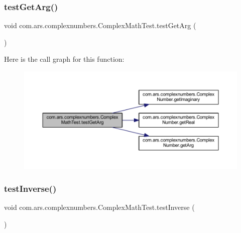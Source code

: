 \subsubsection{\texorpdfstring{test\+Get\+Arg()}{testGetArg()}}
{\footnotesize\ttfamily void com.\+ars.\+complexnumbers.\+Complex\+Math\+Test.\+test\+Get\+Arg (\begin{DoxyParamCaption}{ }\end{DoxyParamCaption})}

Here is the call graph for this function\+:\nopagebreak
\begin{figure}[H]
\begin{center}
\leavevmode
\includegraphics[width=350pt]{classcom_1_1ars_1_1complexnumbers_1_1_complex_math_test_a2102465aa80b8303b2de77a3e87ffea9_cgraph}
\end{center}
\end{figure}
\hypertarget{classcom_1_1ars_1_1complexnumbers_1_1_complex_math_test_a2c47b64252c4ecbe00d38fe89e66a9bb}{}\label{classcom_1_1ars_1_1complexnumbers_1_1_complex_math_test_a2c47b64252c4ecbe00d38fe89e66a9bb} 
\subsubsection{\texorpdfstring{test\+Inverse()}{testInverse()}}
{\footnotesize\ttfamily void com.\+ars.\+complexnumbers.\+Complex\+Math\+Test.\+test\+Inverse (\begin{DoxyParamCaption}{ }\end{DoxyParamCaption})}

